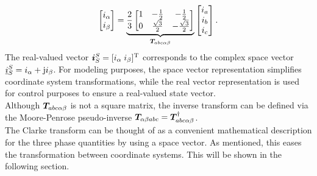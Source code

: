 \begin{equation}
	\begin{bmatrix}
		i_\alpha \\
		i_\beta
	\end{bmatrix}
	=
	\underbrace{
		\frac{2}{3}
		\begin{bmatrix}
			1 & -\frac{1}{2} & -\frac{1}{2} \\
			0 & \frac{\sqrt{3}}{2} & -\frac{\sqrt{3}}{2}
	\end{bmatrix}}_{\bm{T}_{abc \alpha \beta }}
	\begin{bmatrix}
		i_a \\
		i_b \\
		i_c
	\end{bmatrix}.
	\label{equ:0_clarke}
\end{equation}
The real-valued vector $\bm{i}_S^S = [i_\alpha \;i_\beta]^{\mathrm{T}}$ corresponds to the complex space vector $\underline{i}_S^S = i_\alpha + \mathrm{j} i_\beta$. For modeling purposes, the space vector representation simplifies coordinate system transformations, while the real vector representation is used for control purposes to ensure a real-valued state vector.\\
Although $\bm{T}_{abc \alpha \beta }$ is not a square matrix, the inverse transform can be defined via the Moore-Penrose pseudo-inverse $\bm{T}_{\alpha \beta abc }  = \bm{T}_{abc \alpha \beta }^{\dagger}$.\\
The Clarke transform can be thought of as a convenient mathematical description for the three phase quantities by using a space vector. As mentioned, this eases the transformation between coordinate systems. This will be shown in the following section.


